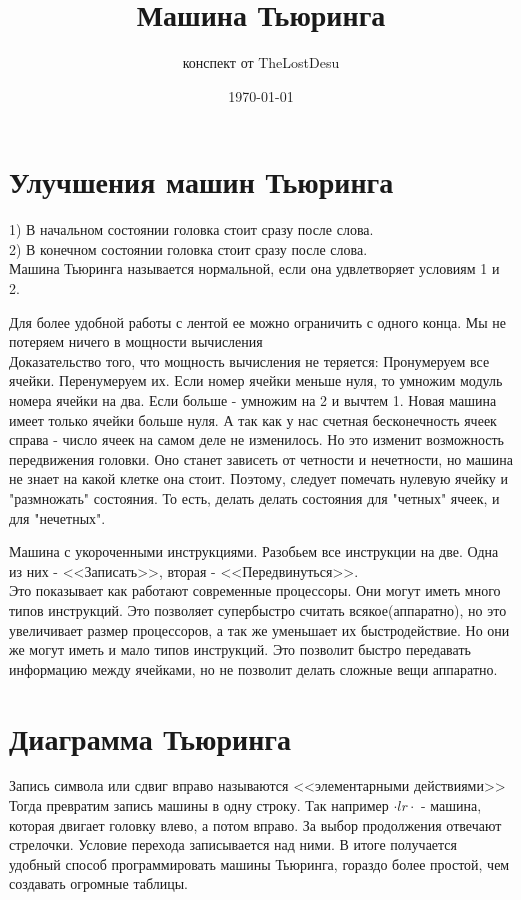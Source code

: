 \documentclass[a4paper,12pt]{article}
\author{конспект от TheLostDesu}
\title{Машина Тьюринга}
\date{\today}
\begin{document}
\maketitle
\section{Улучшения машин Тьюринга}
1) В начальном состоянии головка стоит сразу после слова.\\
2) В конечном состоянии головка стоит сразу после слова.\\
Машина Тьюринга называется нормальной, если она удвлетворяет условиям 1 и 2.

Для более удобной работы с лентой ее можно ограничить с одного конца. Мы не потеряем ничего в мощности вычисления\\
Доказательство того, что мощность вычисления не теряется:
Пронумеруем все ячейки. Перенумеруем их. Если номер ячейки меньше нуля, то умножим модуль номера ячейки на два. Если больше - умножим на 2 и вычтем 1. Новая машина имеет только ячейки больше нуля. А так как у нас счетная бесконечность ячеек справа - число ячеек на самом деле не изменилось. Но это изменит возможность передвижения головки. Оно станет зависеть от четности и нечетности, но машина не знает на какой клетке она стоит. Поэтому, следует помечать нулевую ячейку и "размножать" состояния. То есть, делать делать состояния для "четных" ячеек, и для "нечетных". 

Машина с укороченными инструкциями. Разобьем все инструкции на две. Одна из них - <<Записать>>, вторая - <<Передвинуться>>.\\
Это показывает как работают современные процессоры. Они могут иметь много типов инструкций. Это позволяет супербыстро считать всякое(аппаратно), но это увеличивает размер процессоров, а так же уменьшает их быстродействие. Но они же могут иметь и мало типов инструкций. Это позволит быстро передавать информацию между ячейками, но не позволит делать сложные вещи аппаратно. 
\section{Диаграмма Тьюринга}
Запись символа или сдвиг вправо называются <<элементарными действиями>>\\
 Тогда превратим запись машины в одну строку. Так например $\cdot lr\cdot $ - машина, которая двигает головку влево, а потом вправо. За выбор продолжения отвечают стрелочки. Условие перехода записывается над ними. В итоге получается удобный способ программировать машины Тьюринга, гораздо более простой, чем создавать огромные таблицы. \\
\end{document}

